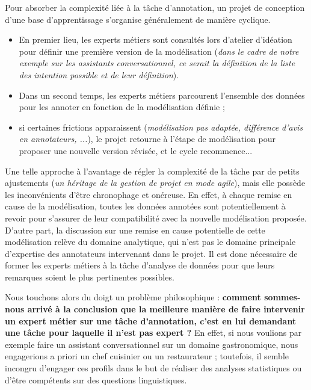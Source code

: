 		Pour absorber la complexité liée à la tâche d'annotation, un projet de conception d'une base d'apprentissage s'organise généralement de manière cyclique.
		\begin{itemize}
			\item En premier lieu, les experts métiers sont consultés lors d'atelier d'idéation pour définir une première version de la modélisation (\textit{dans le cadre de notre exemple sur les assistants conversationnel, ce serait la définition de la liste des intention possible et de leur définition}).
			\item Dans un second temps, les experts métiers parcourent l'ensemble des données pour les annoter en fonction de la modélisation définie ;
			\item si certaines frictions apparaissent (\textit{modélisation pas adaptée, différence d'avis en annotateurs, ...}), le projet retourne à l'étape de modélisation pour proposer une nouvelle version révisée, et le cycle recommence...
		\end{itemize}
		
		Une telle approche à l'avantage de régler la complexité de la tâche par de petits ajustements (\textit{un héritage de la gestion de projet en mode agile}), mais elle possède les inconvénients d'être chronophage et onéreuse.
		En effet, à chaque remise en cause de la modélisation, toutes les données annotées sont potentiellement à revoir pour s'assurer de leur compatibilité avec la nouvelle modélisation proposée.
		D'autre part, la discussion sur une remise en cause potentielle de cette modélisation relève du domaine analytique, qui n'est pas le domaine principale d'expertise des annotateurs intervenant dans le projet.
		Il est donc nécessaire de former les experts métiers à la tâche d'analyse de données pour que leurs remarques soient le plus pertinentes possibles.
		\newline
		
		Nous touchons alors du doigt un problème philosophique : \textbf{comment sommes-nous arrivé à la conclusion que la meilleure manière de faire intervenir un expert métier sur une tâche d'annotation, c'est en lui demandant une tâche pour laquelle il n'est pas expert ?}
		En effet, si nous voulions par exemple faire un assistant conversationnel sur un domaine gastronomique, nous engagerions a priori un chef cuisinier ou un restaurateur ; toutefois, il semble incongru d'engager ces profils dans le but de réaliser des analyses statistiques ou d'être compétents sur des questions linguistiques.
		
